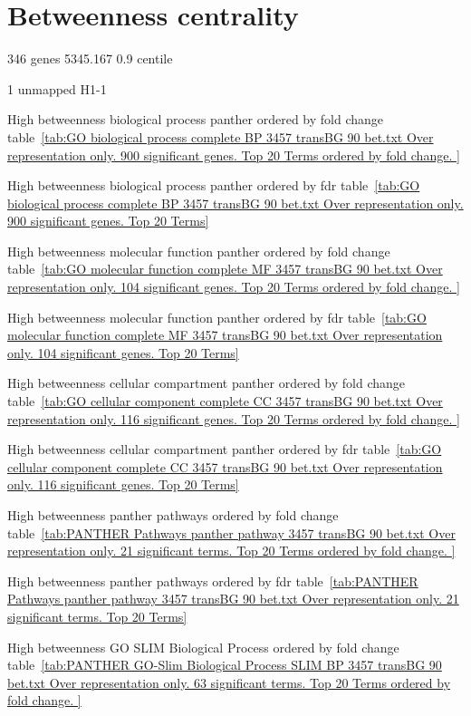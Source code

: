 \clearpage

\section{Betweenness centrality}

346 genes
5345.167 0.9 centile

1 unmapped
H1-1

High betweenness biological process panther ordered by fold change table~\ref{tab:GO biological process complete BP 3457 transBG 90 bet.txt Over representation only. 900 significant genes. Top 20 Terms ordered by fold change. }


High betweenness biological process panther ordered by fdr table~\ref{tab:GO biological process complete BP 3457 transBG 90 bet.txt Over representation only. 900 significant genes. Top 20 Terms}

High betweenness molecular function panther ordered by fold change table~\ref{tab:GO molecular function complete MF 3457 transBG 90 bet.txt Over representation only. 104 significant genes. Top 20 Terms ordered by fold change. }


High betweenness molecular function panther ordered by fdr table~\ref{tab:GO molecular function complete MF 3457 transBG 90 bet.txt Over representation only. 104 significant genes. Top 20 Terms}

High betweenness cellular compartment panther ordered by fold change table~\ref{tab:GO cellular component complete CC 3457 transBG 90 bet.txt Over representation only. 116 significant genes. Top 20 Terms ordered by fold change. }


High betweenness cellular compartment panther ordered by fdr table~\ref{tab:GO cellular component complete CC 3457 transBG 90 bet.txt Over representation only. 116 significant genes. Top 20 Terms}

High betweenness panther pathways ordered by fold change table~\ref{tab:PANTHER Pathways panther pathway 3457 transBG 90 bet.txt Over representation only. 21 significant terms. Top 20 Terms ordered by fold change. }

High betweenness panther pathways ordered by fdr table~\ref{tab:PANTHER Pathways panther pathway 3457 transBG 90 bet.txt Over representation only. 21 significant terms. Top 20 Terms}

High betweenness GO SLIM Biological Process ordered by fold change table~\ref{tab:PANTHER GO-Slim Biological Process SLIM BP 3457 transBG 90 bet.txt Over representation only. 63 significant terms. Top 20 Terms ordered by fold change. }


